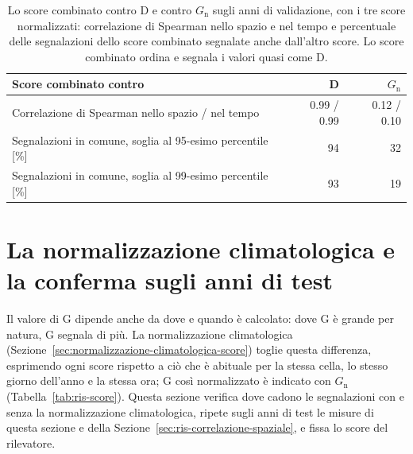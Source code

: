 \begin{table}[htbp]
    \centering
    \footnotesize
    \caption{Lo score combinato contro D e contro $G_{\mathrm{n}}$ sugli anni di validazione, con i tre score normalizzati: correlazione di Spearman nello spazio e nel tempo e percentuale delle segnalazioni dello score combinato segnalate anche dall'altro score. Lo score combinato ordina e segnala i valori quasi come D.}
    \label{tab:ris-combinato}
    \vspace{0.6em}
    \begin{tabular}{@{}L{0.56}rr@{}}
        \toprule
        Score combinato contro & D & $G_{\mathrm{n}}$ \\
        \midrule
        Correlazione di Spearman nello spazio / nel tempo & 0.99 / 0.99 & 0.12 / 0.10 \\
        Segnalazioni in comune, soglia al 95-esimo percentile [\%] & 94 & 32 \\
        Segnalazioni in comune, soglia al 99-esimo percentile [\%] & 93 & 19 \\
        \bottomrule
    \end{tabular}
\end{table}

\section{La normalizzazione climatologica e la conferma sugli anni di test}
\label{sec:ris-climatologia}
\label{sec:ris-conferma}

Il valore di G dipende anche da dove e quando è calcolato: dove G è grande per natura, G segnala di più. La normalizzazione climatologica (Sezione~\ref{sec:normalizzazione-climatologica-score}) toglie questa differenza, esprimendo ogni score rispetto a ciò che è abituale per la stessa cella, lo stesso giorno dell'anno e la stessa ora; G così normalizzato è indicato con $G_{\mathrm{n}}$ (Tabella~\ref{tab:ris-score}). Questa sezione verifica dove cadono le segnalazioni con e senza la normalizzazione climatologica, ripete sugli anni di test le misure di questa sezione e della Sezione~\ref{sec:ris-correlazione-spaziale}, e fissa lo score del rilevatore.

